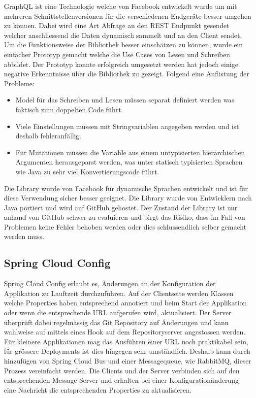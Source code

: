 GraphQL ist eine Technologie welche von Facebook entwickelt wurde um mit mehreren Schnittstellenversionen für die verschiedenen Endgeräte besser umgehen zu können. Dabei wird eine Art Abfrage an den \gls{REST} Endpunkt gesendet welcher anschliessend die Daten dynamisch sammelt und an den Client sendet. Um die Funktionsweise der Bibliothek besser einschätzen zu können, wurde ein einfacher Prototyp gemacht welche die Use Cases von Lesen und Schreiben abbildet.\newline
Der Prototyp konnte erfolgreich umgesetzt werden hat jedoch einige negative Erkenntnisse über die Bibliothek zu gezeigt. Folgend eine Auflistung der Probleme:\newline
\begin{itemize}
	\item Model für das Schreiben und Lesen müssen separat definiert werden was faktisch zum doppelten Code führt.
	\item Viele Einstellungen müssen mit Stringvariablen angegeben werden und ist deshalb fehleranfällig.
	\item Für Mutationen müssen die Variable aus einem untypisierten hierarchischen Argumenten herausgeparst werden, was unter statisch typisierten Sprachen wie Java zu sehr viel Konvertierungscode führt.
\end{itemize}
Die Library wurde von Facebook für dynamische Sprachen entwickelt und ist für diese Verwendung sicher besser geeignet. Die Library wurde von Entwicklern nach Java portiert und wird auf GitHub gehostet. Der Zustand der Library ist nur anhand von GitHub schwer zu evaluieren und birgt das Risiko, dass im Fall von Problemen keine Fehler behoben werden oder dies schlussendlich selber gemacht werden muss.

\subsection{Spring Cloud Config}

Spring Cloud Config erlaubt es, Änderungen an der Konfiguration der Applikation zu Lauftzeit durchzuführen. Auf der Clientseite werden Klassen welche Properties haben entsprechend annotiert und beim Start der Applikation oder wenn die entsprechende URL aufgerufen wird, aktualisiert. Der Server überprüft dabei regelmässig das Git Repository auf Änderungen und kann wahlweise auf mittels eines Hook auf dem Repositoryserver angestossen werden. Für kleinere Applikationen mag das Ausführen einer URL noch praktikabel sein, für grössere Deployments ist dies hingegen sehr umständlich. Deshalb kann durch hinzufügen von Spring Cloud Bus und einer Messagequeue, wie RabbitMQ, dieser Prozess vereinfacht werden. Die Clients und der Server verbinden sich auf den entsprechenden Message Server und erhalten bei einer Konfigurationänderung eine Nachricht die entsprechenden Properties zu aktualisieren.

